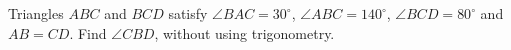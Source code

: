 Triangles $ABC$ and $BCD$ satisfy $\angle BAC=30^\circ$, $\angle ABC=140^\circ$, $\angle BCD=80^\circ$ and $AB=CD$. Find $\angle CBD$, without using trigonometry.
